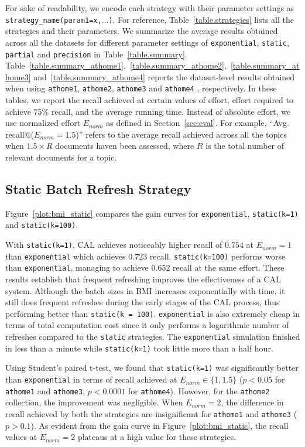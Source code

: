 For sake of readability, we encode each strategy with their parameter
settings as \texttt{strategy\_name(param1=x,$\ldots$)}. For reference, Table~\ref{table.strategies}
lists all the strategies and their parameters.
We summarize the average results obtained across all the datasets for different
parameter settings of \texttt{exponential}, \texttt{static},
\texttt{partial} and \texttt{precision} in Table~\ref{table.summary}.
Table~\ref{table.summary_athome1},~\ref{table.summary_athome2},~\ref{table.summary_athome3}
and~\ref{table.summary_athome4} reports the dataset-level results obtained when
using \texttt{athome1}, \texttt{athome2}, \texttt{athome3} and \texttt{athome4}
, respectively.
In these tables, we report the recall achieved at certain values of effort, effort required to
achieve $75\%$ recall, and the average running time. Instead of absolute effort,
we use normalized effort $E_{norm}$ as defined in Section~\ref{sec:eval}. For
example, ``Avg. recall@($E_{norm}=1.5$)'' refers to the average recall achieved
across all the topics when $1.5 \times R$ documents haven been assessed, where $R$
is the total number of relevant documents for a topic.

\subsection*{Static Batch Refresh Strategy}
Figure~\ref{plot:bmi_static} compares the gain curves for \texttt{exponential},
\texttt{static(k=1)} and \texttt{static(k=100)}.

With \texttt{static(k=1)}, CAL achieves noticeably higher recall of
$0.754$ at $E_{norm} = 1$ than \texttt{exponential} which achieves $0.723$
recall.  \texttt{static(k=100)} performs worse than
\texttt{exponential}, managing to achieve $0.652$ recall at the same effort.
These results establish that frequent refreshing improves the effectiveness of a
CAL system.
Although the batch sizes in BMI increases exponentially with time, it still does
frequent refreshes during the early stages of the CAL process, thus performing
better than \texttt{static(k = 100)}. \texttt{exponential} is also
extremely cheap in terms of total computation cost since it only performs a
logarithmic number of refreshes compared to the \texttt{static} strategies.
The \texttt{exponential} simulation finished in less than a minute while
\texttt{static(k=1)} took little more than a half hour.

Using Student's paired t-test, we found that \texttt{static(k=1)} was
significantly better than \texttt{exponential} in terms of recall achieved at
$E_{norm} \in \{1,1.5\}$ ($p < 0.05$ for \texttt{athome1} and \texttt{athome3},
$p < 0.0001$ for \texttt{athome4}). However, for the \texttt{athome2}
collection, the improvement was negligible. When $E_{norm} = 2$, the difference
in recall achieved by both the strategies are insignificant for \texttt{athome1}
and \texttt{athome3} ($p > 0.1$). As evident from the gain curve in
Figure~\ref{plot:bmi_static}, the recall values at $E_{norm} = 2$ plateaus
at a high value for these strategies.

